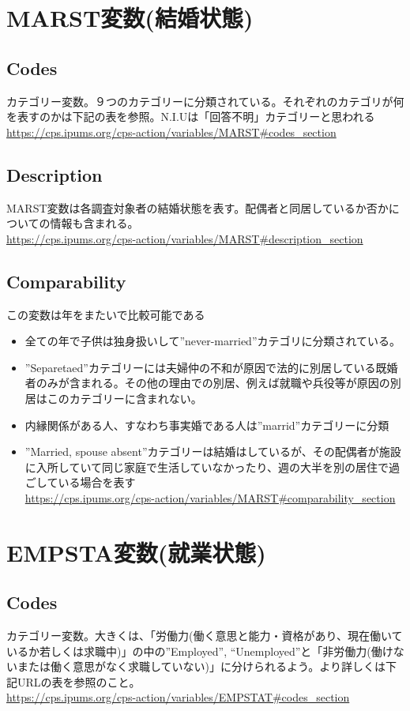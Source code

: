 \documentclass{jsarticle}
\begin{document}
\section{MARST変数(結婚状態)}

\subsection{Codes}
カテゴリー変数。９つのカテゴリーに分類されている。それぞれのカテゴリが何を表すのかは下記の表を参照。N.I.Uは「回答不明」カテゴリーと思われる\\
\url{https://cps.ipums.org/cps-action/variables/MARST#codes_section}

\subsection{Description}
MARST変数は各調査対象者の結婚状態を表す。配偶者と同居しているか否かについての情報も含まれる。\\
\url{https://cps.ipums.org/cps-action/variables/MARST#description_section}

\subsection{Comparability}
この変数は年をまたいで比較可能である

\begin{itemize}
    \item 全ての年で子供は独身扱いして”never-married”カテゴリに分類されている。\item ”Separetaed”カテゴリーには夫婦仲の不和が原因で法的に別居している既婚者のみが含まれる。その他の理由での別居、例えば就職や兵役等が原因の別居はこのカテゴリーに含まれない。
    \item 内縁関係がある人、すなわち事実婚である人は”marrid”カテゴリーに分類
    \item ”Married, spouse absent”カテゴリーは結婚はしているが、その配偶者が施設に入所していて同じ家庭で生活していなかったり、週の大半を別の居住で過ごしている場合を表す\\
    \url{https://cps.ipums.org/cps-action/variables/MARST#comparability_section}
\end{itemize}

\section{EMPSTA変数(就業状態)}

\subsection{Codes}
カテゴリー変数。大きくは、「労働力(働く意思と能力・資格があり、現在働いているか若しくは求職中)」の中の”Employed”, “Unemployed”と「非労働力(働けないまたは働く意思がなく求職していない)」に分けられるよう。より詳しくは下記URLの表を参照のこと。\\
\url{https://cps.ipums.org/cps-action/variables/EMPSTAT#codes_section}
\end{document}
